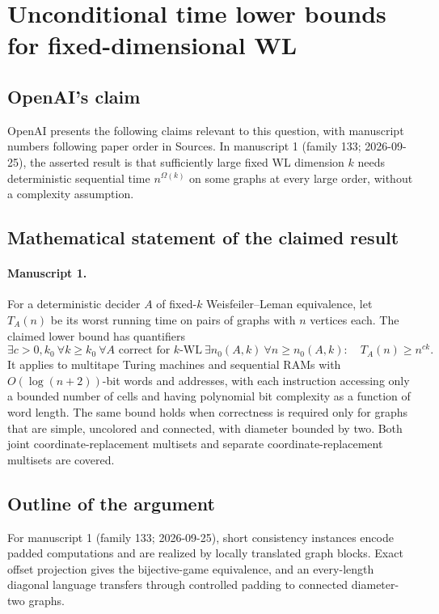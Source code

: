 \documentclass[11pt]{article}
\begin{document}
\section*{Unconditional time lower bounds for fixed-dimensional WL}

\subsection{OpenAI's claim}
OpenAI presents the following claims relevant to this question, with manuscript numbers following paper order in Sources. In manuscript 1 (family 133; 2026-09-25), the asserted result is that sufficiently large fixed WL dimension $k$ needs deterministic sequential time $n^{\Omega(k)}$ on some graphs at every large order, without a complexity assumption.

\subsection{Mathematical statement of the claimed result}
\paragraph{Manuscript 1.}
For a deterministic decider $A$ of fixed-$k$ Weisfeiler--Leman equivalence, let $T_A(n)$ be its worst running time on pairs of graphs with $n$ vertices each. The claimed lower bound has quantifiers
\[
 \exists c>0,k_0\ \forall k\ge k_0\ \forall A\text{ correct for }k\text{-WL}
 \ \exists n_0(A,k)\ \forall n\ge n_0(A,k):\quad T_A(n)\ge n^{ck}.
\]
It applies to multitape Turing machines and sequential RAMs with $O(\log(n+2))$-bit words and addresses, with each instruction accessing only a bounded number of cells and having polynomial bit complexity as a function of word length. The same bound holds when correctness is required only for graphs that are simple, uncolored and connected, with diameter bounded by two. Both joint coordinate-replacement multisets and separate coordinate-replacement multisets are covered.

\subsection{Outline of the argument}
For manuscript 1 (family 133; 2026-09-25), short consistency instances encode padded computations and are realized by locally translated graph blocks. Exact offset projection gives the bijective-game equivalence, and an every-length diagonal language transfers through controlled padding to connected diameter-two graphs.
\end{document}
